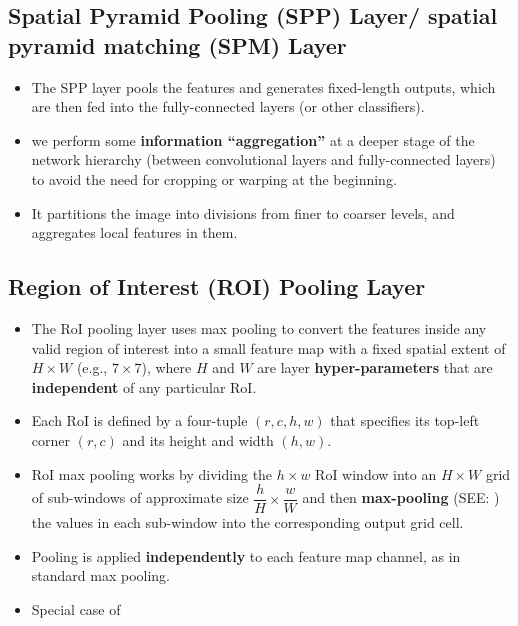 \subsection{Spatial Pyramid Pooling (SPP) Layer/ spatial pyramid matching (SPM) Layer \cite{arxiv/1406.4729-sppnet}}\label{Spatial Pyramid Pooling (SPP) Layer/ spatial pyramid matching (SPM) Layer}

\begin{itemize}
    \item The SPP layer pools the features and generates fixed-length outputs, which are then fed into the fully-connected layers (or other classifiers).

    \item we perform some \textbf{information “aggregation”} at a deeper stage of the network hierarchy (between convolutional layers and fully-connected layers) to avoid the need for cropping or warping at the beginning.

    \item  It partitions the image into divisions from finer to coarser levels, and aggregates local features in them.

    
\end{itemize}



\subsection{Region of Interest (ROI) Pooling Layer \cite{arxiv/1504.08083-fast-rcnn}}\label{cnn: Region of Interest (ROI) Pooling Layer}

\begin{itemize}
    \item The RoI pooling layer uses max pooling to convert the features inside any valid region of interest into a small feature map with a fixed spatial extent of $H \times W$ (e.g., $7 \times 7$), where $H$ and $W$ are layer \textbf{hyper-parameters} that are \textbf{independent} of any particular RoI.

    \item Each RoI is defined by a four-tuple $(r, c, h, w)$ that specifies its top-left corner $(r, c)$ and its height and width $(h, w)$.

    \item RoI max pooling works by dividing the $h \times w$ RoI window into an $H \times W$ grid of sub-windows of approximate size ${\displaystyle \dfrac{h}{H} \times \dfrac{w}{W}}$ and then \textbf{max-pooling} (SEE: ) the values in each sub-window into the corresponding output grid cell.

    \item Pooling is applied \textbf{independently} to each feature map channel, as in standard max pooling. 

    \item Special case of 
\end{itemize}

